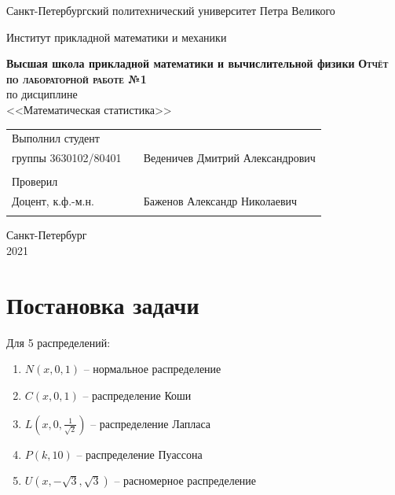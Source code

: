 \documentclass[a4paper]{article}
\begin{document}
\begin{titlepage}
  \begin{center}
    \large
    Санкт-Петербургский политехнический университет Петра Великого
    
    Институт прикладной математики и механики
    
    \textbf{Высшая школа прикладной математики и вычислительной физики}
    \vfill
    \textsc{\textbf{\large{Отчёт по лабораторной работе №1}}}\\[5mm]
     по дисциплине\\ <<Математическая статистика>>\\
\end{center}

\vfill

\begin{tabular}{l p{} l}
Выполнил студент \\группы 3630102/80401 && Веденичев Дмитрий Александрович \\
\\
Проверил\\Доцент, к.ф.-м.н.& \hspace{0pt} &   Баженов Александр Николаевич \\\\
\end{tabular}

\hfill \break
\hfill \break
\begin{center} Санкт-Петербург \\2021 \end{center}
\thispagestyle{empty}
\end{titlepage}
\newpage
\newpage
\begin{center}
    \setcounter{page}{2}
    \tableofcontents
\end{center}
\newpage
\begin{center}
    \setcounter{page}{3}
    \listoffigures
\end{center}

\newpage

\section {Постановка задачи}
\noindent Для 5 распределений:
\begin{enumerate}
	\item $N(x, 0, 1)$ -- нормальное распределение
	\item $C(x, 0, 1)$ -- распределение Коши
	\item $L(x, 0, \frac{1}{\sqrt{2}})$ -- распределение Лапласа 
	\item $P(k, 10)$ -- распределение Пуассона
	\item $U(x, -\sqrt{3}, \sqrt{3})$ -- расномерное распределение
\end{enumerate}
\end{document}
